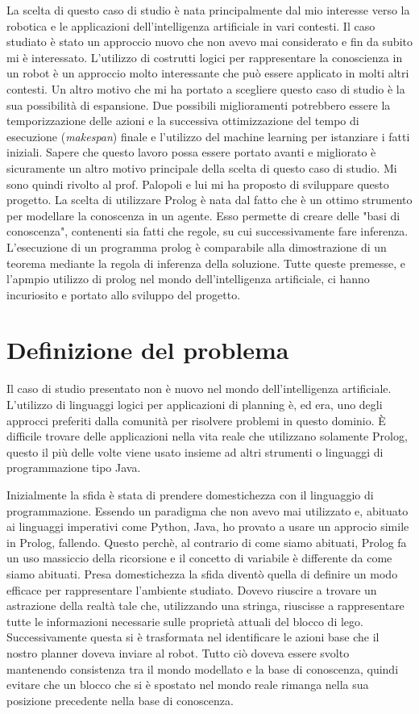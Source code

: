 La scelta di questo caso di studio è nata principalmente dal mio interesse verso la robotica e le applicazioni dell'intelligenza artificiale in vari contesti.
Il caso studiato è stato un approccio nuovo che non avevo mai considerato e fin da subito mi è interessato. L'utilizzo di costrutti logici per rappresentare
la conoscienza in un robot è un approccio molto interessante che può essere applicato in molti altri contesti.
Un altro motivo che mi ha portato a scegliere questo caso di studio è la sua possibilità di espansione. Due possibili miglioramenti potrebbero essere
la temporizzazione delle azioni e la successiva ottimizzazione del tempo
di esecuzione (\textit{makespan}) finale e l'utilizzo del machine learning per istanziare i fatti iniziali.
Sapere che questo lavoro possa essere portato avanti e migliorato è sicuramente un altro motivo principale della scelta di questo caso di studio.
Mi sono quindi rivolto al prof. Palopoli e lui mi ha proposto di sviluppare questo progetto.
La scelta di utilizzare Prolog è nata dal fatto che è un ottimo strumento per modellare la conoscenza in un agente.
Esso permette di creare delle "basi di conoscenza", contenenti sia fatti che regole, su cui successivamente fare inferenza.
L'esecuzione di un programma prolog è comparabile alla dimostrazione di un teorema mediante la regola di inferenza della soluzione.
Tutte queste premesse, e l'apmpio utilizzo di prolog nel mondo dell'intelligenza artificiale, ci hanno incuriosito e portato allo sviluppo del progetto.

\section{Definizione del problema}
\label{sec:defprob}
Il caso di studio presentato non è nuovo nel mondo dell'intelligenza artificiale. L'utilizzo di linguaggi logici per applicazioni di planning è, ed era, uno
degli approcci preferiti dalla comunità per risolvere problemi in questo dominio. È difficile trovare delle applicazioni nella vita reale che utilizzano solamente Prolog, questo il 
più delle volte viene usato insieme ad altri strumenti o linguaggi di programmazione tipo Java. 

Inizialmente la sfida è stata di prendere domestichezza con il linguaggio di programmazione.
Essendo un paradigma che non avevo mai utilizzato e, abituato ai linguaggi imperativi come Python, Java, ho provato a usare un approcio simile
in Prolog, fallendo. Questo perchè, al contrario di come siamo abituati, Prolog fa un uso massiccio della ricorsione e il concetto di variabile è differente da come siamo abituati. 
Presa domestichezza la sfida diventò quella di definire un modo efficace per rappresentare l'ambiente studiato.
Dovevo riuscire a trovare un astrazione della realtà tale che, utilizzando una stringa, riuscisse a rappresentare tutte le informazioni necessarie sulle proprietà
attuali del blocco di lego. Successivamente questa si è trasformata nel identificare le azioni base che il nostro planner doveva inviare al robot.
Tutto ciò doveva essere svolto mantenendo consistenza tra il mondo modellato e la base di conoscenza, quindi evitare che un blocco che si è spostato
nel mondo reale rimanga nella sua posizione precedente nella base di conoscenza. 

